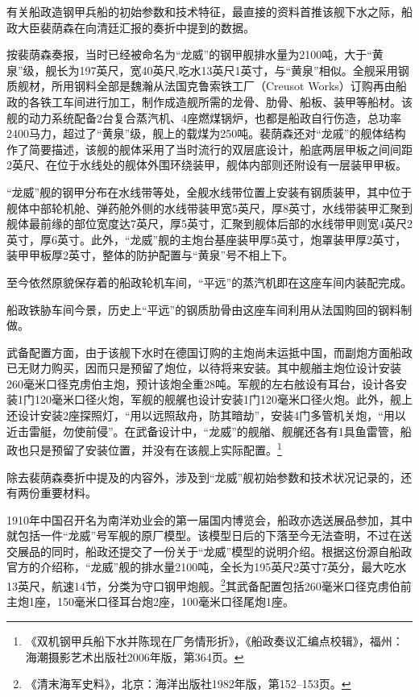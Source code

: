 \documentclass[12pt,UTF8]{ctexbook}
\begin{document}
有关船政造钢甲兵船的初始参数和技术特征，最直接的资料首推该舰下水之际，船政大臣裴荫森在向清廷汇报的奏折中提到的数据。

按裴荫森奏报，当时已经被命名为“龙威”的钢甲舰排水量为2100吨，大于“黄泉”级，舰长为197英尺，宽40英尺,吃水13英尺1英寸，与“黄泉”相似。全舰采用钢质舰材，所用钢料全部是魏瀚从法国克鲁索铁工厂（Creusot Works）订购再由船政的各铁工车间进行加工，制作成造舰所需的龙骨、肋骨、船板、装甲等船材。该舰的动力系统配备2台复合蒸汽机、4座燃煤锅炉，也都是船政自行伤造，总功率2400马力，超过了“黄泉”级，舰上的载煤为250吨。裴荫森还对“龙戚”的舰体结构作了简要描述，该舰的舰体采用了当时流行的双层底设计，船底两层甲板之间间距2英尺、在位于水线处的舰体外围环绕装甲，舰体内部则还附设有一层装甲甲板。

“龙威”舰的钢甲分布在水线带等处，全舰水线带位置上安装有钢质装甲，其中位于舰体中部轮机舱、弹药舱外侧的水线带装甲宽5英尺，厚8英寸，水线带装甲汇聚到舰体最前缘的部位宽度达7英尺，厚5英寸，汇聚到舰体后部的水线带甲则宽4英尺2英寸，厚6英寸。此外，“龙威”舰的主炮台基座装甲厚5英寸，炮罩装甲厚2英寸，装甲甲板厚2英寸，整体的防护配置与“黄泉”号不相上下。

至今依然原貌保存着的船政轮机车间，“平远”的蒸汽机即在这座车间内装配完成。

船政铁胁车间今景，历史上“平远”的钢质肋骨由这座车间利用从法国购回的钢料制做。

武备配置方面，由于该舰下水时在德国订购的主炮尚未运抵中国，而副炮方面船政已无财力购买，因而只是预留了炮位，以待将来安装。其中舰艏主炮位设计安装260毫米口径克虏伯主炮，预计该炮全重28吨。军舰的左右舷设有耳台，设计各安装1门120毫米口径火炮，军舰的舰艉也设计安装1门120毫米口径火炮。此外，舰上还设计安装2座探照灯，“用以远照敌舟，防其暗劫”，安装4门多管机关炮，“用以近击雷艇，勿使前侵”。在武备设计中，“龙威”的舰艏、舰艉还各有1具鱼雷管，船政也只是预留了安装位置，并没有在该舰上实际配置。\footnote{《双机钢甲兵船下水并陈现在厂务情形折》，《船政奏议汇编点校辑》，福州：海潮摄影艺术出版社2006年版，第364页。}

除去裴荫森奏折中提及的内容外，涉及到“龙威”舰初始参数和技术状况记录的，还有两份重要材料。

1910年中国召开名为南洋劝业会的第一届国内博览会，船政亦选送展品参加，其中就包括一件“龙威”号军舰的原厂模型。该模型日后的下落至今无法查明，不过在送交展品的同时，船政还提交了一份关于“龙威”模型的说明介绍。根据这份源自船政官方的介绍称，“龙威”舰的排水量2100吨，全长为195英尺2英寸7英分，最大吃水13英尺，航速14节，分类为守口钢甲炮舰。\footnote{《清末海军史料》，北京：海洋出版社1982年版，第152--153页。}其武备配置包括260毫米口径克虏伯前主炮1座，150毫米口径耳台炮2座，100毫米口径尾炮1座。
\end{document}
